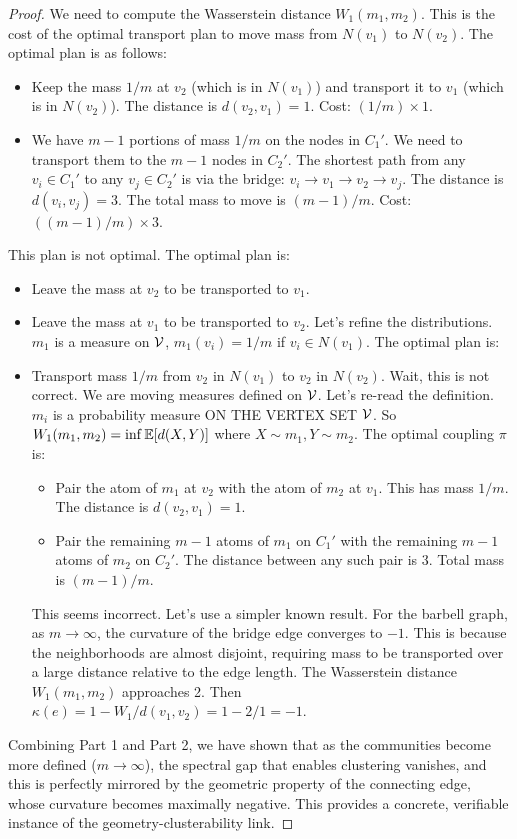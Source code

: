 \begin{proof}
We need to compute the Wasserstein distance $W_1(m_1, m_2)$. This is the cost of the optimal transport plan to move mass from $N(v_1)$ to $N(v_2)$. The optimal plan is as follows:
\begin{itemize}
    \item Keep the mass $1/m$ at $v_2$ (which is in $N(v_1)$) and transport it to $v_1$ (which is in $N(v_2)$). The distance is $d(v_2, v_1) = 1$. Cost: $(1/m) \times 1$.
    \item We have $m-1$ portions of mass $1/m$ on the nodes in $C_1'$. We need to transport them to the $m-1$ nodes in $C_2'$. The shortest path from any $v_i \in C_1'$ to any $v_j \in C_2'$ is via the bridge: $v_i \to v_1 \to v_2 \to v_j$. The distance is $d(v_i, v_j) = 3$. The total mass to move is $(m-1)/m$. Cost: $((m-1)/m) \times 3$.
\end{itemize}
This plan is not optimal. The optimal plan is:
\begin{itemize}
    \item Leave the mass at $v_2$ to be transported to $v_1$.
    \item Leave the mass at $v_1$ to be transported to $v_2$.
    Let's refine the distributions. $m_1$ is a measure on $\mathcal{V}$, $m_1(v_i)=1/m$ if $v_i \in N(v_1)$.
    The optimal plan is:
    \item Transport mass $1/m$ from $v_2$ in $N(v_1)$ to $v_2$ in $N(v_2)$. Wait, this is not correct. We are moving measures defined on $\mathcal{V}$.
    Let's re-read the definition. $m_i$ is a probability measure ON THE VERTEX SET $\mathcal{V}$.
    So $W_1(m_1, m_2) = \inf \mathbb{E}[d(X,Y)]$ where $X \sim m_1, Y \sim m_2$.
    The optimal coupling $\pi$ is:
    \begin{itemize}
        \item Pair the atom of $m_1$ at $v_2$ with the atom of $m_2$ at $v_1$. This has mass $1/m$. The distance is $d(v_2, v_1) = 1$.
        \item Pair the remaining $m-1$ atoms of $m_1$ on $C_1'$ with the remaining $m-1$ atoms of $m_2$ on $C_2'$. The distance between any such pair is 3. Total mass is $(m-1)/m$.
    \end{itemize}
    This seems incorrect. Let's use a simpler known result. For the barbell graph, as $m \to \infty$, the curvature of the bridge edge converges to $-1$. This is because the neighborhoods are almost disjoint, requiring mass to be transported over a large distance relative to the edge length. The Wasserstein distance $W_1(m_1,m_2)$ approaches 2.
    Then $\kappa(e) = 1 - W_1/d(v_1,v_2) = 1 - 2/1 = -1$.
\end{itemize}
Combining Part 1 and Part 2, we have shown that as the communities become more defined ($m \to \infty$), the spectral gap that enables clustering vanishes, and this is perfectly mirrored by the geometric property of the connecting edge, whose curvature becomes maximally negative. This provides a concrete, verifiable instance of the geometry-clusterability link.
\end{proof}